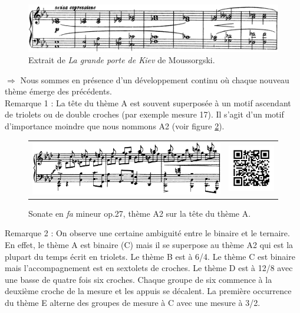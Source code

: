 \begin{figure}[!p]
  \begin{bigcenter}
    \includegraphics[width=15cm, keepaspectratio]{kiev.png}
  \end{bigcenter}
  \caption{\label{grande-porte-de-kiev}Extrait de \emph{La grande porte de Kiev} de Moussorgski.}
\end{figure}

$\Rightarrow$ Nous sommes en présence d'un développement continu où chaque nouveau thème émerge des précédents.\\

Remarque 1 : La tête du thème A est souvent superposée à un motif ascendant de triolets ou de double croches (par exemple mesure 17). Il s'agit d'un motif d'importance moindre que nous nommons A2 (voir figure \ref{sonate-theme-12}).\\

\begin{figure}[!ht]
  \begin{bigcenter}
    \begin{tabular}{lr}
      \includegraphics[width=12.5cm, keepaspectratio]{sonate-theme-A2.png}
      &
      \includegraphics[width=3cm, keepaspectratio]{op1-qr.png}
    \end{tabular}
  \end{bigcenter}
  \caption{\label{sonate-theme-12}Sonate en \emph{fa} mineur op.27, thème A2 sur la tête du thème A.}
\end{figure}

Remarque 2 : On observe une certaine ambiguité entre le binaire et le ternaire. En effet, le thème A est binaire (C) mais il se superpose au thème A2 qui est la plupart du temps écrit en triolets. Le thème B est à 6/4. Le thème C est binaire mais l'accompagnement est en sextolets de croches. Le thème D est à 12/8 avec une basse de quatre fois six croches. Chaque groupe de six commence à la deuxième croche de la mesure et les appuis se décalent. La première occurrence du thème E alterne des groupes de mesure à C avec une mesure à 3/2.

